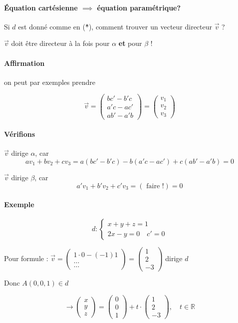 \documentclass[
    11pt,
    a4paper,
    oneside,
    headinlcude, footinclude,
    twoside,
]{report}
\newcommand{\myVector}[3]{\begin{pmatrix}#1\\#2\\#3\end{pmatrix}}
\renewcommand{\vec}[1]{\overrightarrow{#1}}
\begin{document}
\paragraph{Équation cartésienne $\implies$ équation paramétrique?}
\label{par:equation_cartesienne_implies_equation_parametrique_}

Si $d$ est donné comme en (\^*), comment trouver un vecteur directeur $\vec v$ ?

 $\vec v$  doit être directeur à la fois pour $\alpha$ \textbf{et} pour $\beta$ !


 \paragraph{Affirmation}
 \label{par:affirmation}
 
 on peut par exemples prendre

 $$\vec v = \myVector {bc'-b'c}{a'c - ac'}{ab'-a'b} = \myVector {v_{1}}{v_{2}}{v_{3}}$$

 \paragraph{Vérifions}
 \label{par:verifions}
 
 $\vec v$ dirige $\alpha$, car 
 $$a v_{1} + b v_{2} + c v_{3} = a(bc' -b'c) - b(a'c - ac') + c (ab' -a'b) = 0 $$

 $\vec v$ dirige $\beta$, car
 $$a' v_{1} + b'v_{2} + c'v_{3} = ( \text{ faire !} ) = 0$$


 \paragraph{Exemple}
 
 $$d : \left\{\begin{array}{l}x + y + z = 1\\2x-y=0 \quad c'=0\end{array}\right.$$

     Pour formule : $\vec v = \myVector {1 \cdot 0 - (-1)1} \ldots \ldots =
     \myVector 1 2 {-3} $  dirige $d$ 

     Donc $A ( 0, 0, 1) \in d$ 

     $$\rightarrow \myVector x y z = \myVector 0 0 1 + t \cdot \myVector 1 2
     {-3}, \quad t \in \mathbb{R}$$
\end{document}
